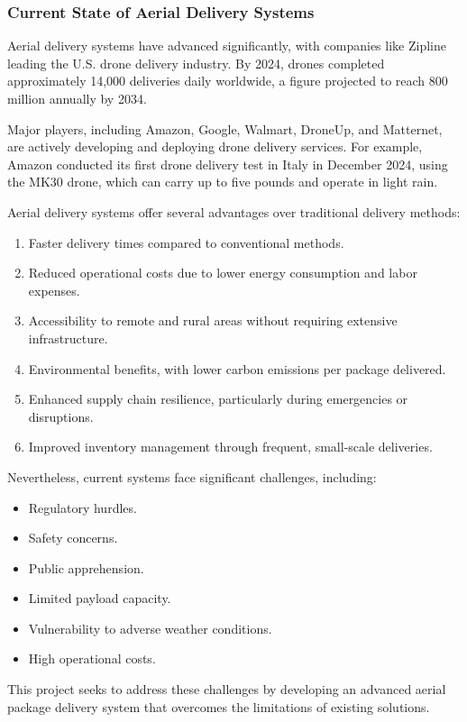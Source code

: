 \documentclass[12pt]{article}
\begin{document}
\subsubsection{Current State of Aerial Delivery Systems}
Aerial delivery systems have advanced significantly, with companies like Zipline leading the U.S. drone delivery industry. By 2024, drones completed approximately 14,000 deliveries daily worldwide, a figure projected to reach 800 million annually by 2034.

Major players, including Amazon, Google, Walmart, DroneUp, and Matternet, are actively developing and deploying drone delivery services. For example, Amazon conducted its first drone delivery test in Italy in December 2024, using the MK30 drone, which can carry up to five pounds and operate in light rain.

Aerial delivery systems offer several advantages over traditional delivery methods:
\begin{enumerate}
    \item Faster delivery times compared to conventional methods.
    \item Reduced operational costs due to lower energy consumption and labor expenses.
    \item Accessibility to remote and rural areas without requiring extensive infrastructure.
    \item Environmental benefits, with lower carbon emissions per package delivered.
    \item Enhanced supply chain resilience, particularly during emergencies or disruptions.
    \item Improved inventory management through frequent, small-scale deliveries.
\end{enumerate}

Nevertheless, current systems face significant challenges, including:
\begin{itemize}
    \item Regulatory hurdles.
    \item Safety concerns.
    \item Public apprehension.
    \item Limited payload capacity.
    \item Vulnerability to adverse weather conditions.
    \item High operational costs.
\end{itemize}

This project seeks to address these challenges by developing an advanced aerial package delivery system that overcomes the limitations of existing solutions.
\end{document}
